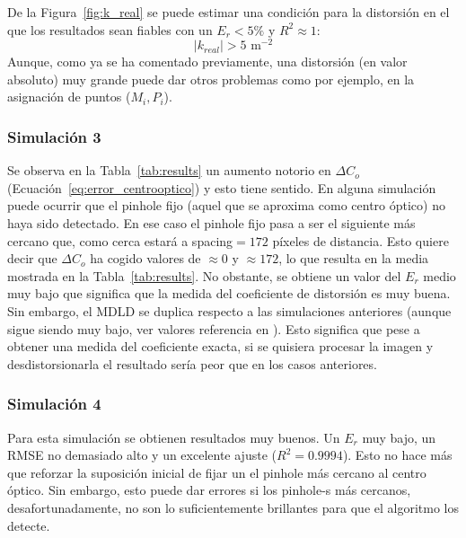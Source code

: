 \documentclass[12pt]{article}
\numberwithin{equation}{section}%
\newcommand{\lightit}[1]{{\lightitfont #1}}
\begin{document}
De la Figura\ \ref{fig:k_real} se puede estimar una condición para la distorsión en el que los resultados sean fiables con un \(E_r<5\%\) y \(R^2\approx1\):
\begin{equation}
    |k_{real}|>5 \text{ m}^{-2}
    \label{eq:condi_kreal}
\end{equation} 
Aunque, como ya se ha comentado previamente, una distorsión (en valor absoluto) muy grande puede dar otros problemas como por ejemplo, en la asignación de puntos (\(M_i, P_i\)).\\

\subsubsection{Simulación 3}

Se observa en la Tabla\ \ref{tab:results} un aumento notorio en \(\Delta C_o\) (Ecuación\ \ref{eq:error_centrooptico}) y esto tiene sentido. En alguna simulación puede ocurrir que el \lightit{pinhole} fijo (aquel que se aproxima como centro óptico) no haya sido detectado. En ese caso el \lightit{pinhole} fijo pasa a ser el siguiente más cercano que, como cerca estará a \lightit{spacing}\(=172\) píxeles de distancia. Esto quiere decir que \(\Delta C_o\) ha cogido valores de \(\approx0\) y \(\approx172\), lo que resulta en la media mostrada en la Tabla\ \ref{tab:results}. No obstante, se obtiene un valor del \(E_r\) medio muy bajo que significa que la medida del coeficiente de distorsión es muy buena. Sin embargo, el MDLD se duplica respecto a las simulaciones anteriores (aunque sigue siendo muy bajo, ver valores referencia en \cite{liao2021deep}). Esto significa que pese a obtener una medida del coeficiente exacta, si se quisiera procesar la imagen y \lightit{desdistorsionarla} el resultado sería peor que en los casos anteriores.

\subsubsection{Simulación 4}

Para esta simulación se obtienen resultados muy buenos. Un \(E_r\) muy bajo, un RMSE no demasiado alto y un excelente ajuste ($R^2=0.9994$). Esto no hace más que reforzar la suposición inicial de fijar un el \lightit{pinhole} más cercano al centro óptico. Sin embargo, esto puede dar errores si los \lightit{pinhole}-s más cercanos, desafortunadamente, no son lo suficientemente brillantes para que el algoritmo los detecte.
\end{document}
